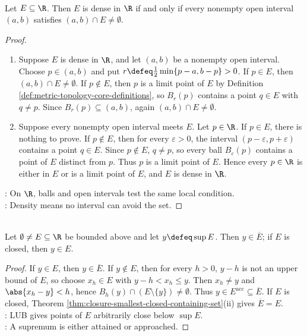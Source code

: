 \begin{proposition} \label{prop:dense-closure-and-interval-test} \\
Let $E\subseteq\R$. Then $E$ is dense in $\R$ if and only if every nonempty open interval $(a,b)$ satisfies $(a,b)\cap E\neq\emptyset$.
\begin{proof}
\begin{enumerate}[label=\roman*.]
\setlength{\itemsep}{0pt}
\item[$(\Rightarrow)$] Suppose $E$ is dense in $\R$, and let $(a,b)$ be a nonempty open interval. Choose $p\in(a,b)$ and put $r\defeq\frac12\min\{p-a,b-p\}>0$. If $p\in E$, then $(a,b)\cap E\neq\emptyset$. If $p\notin E$, then $p$ is a limit point of $E$ by Definition \ref{def:metric-topology-core-definitions}, so $B_r(p)$ contains a point $q\in E$ with $q\neq p$. Since $B_r(p)\subseteq(a,b)$, again $(a,b)\cap E\neq\emptyset$.
\item[$(\Leftarrow)$] Suppose every nonempty open interval meets $E$. Let $p\in\R$. If $p\in E$, there is nothing to prove. If $p\notin E$, then for every $\varepsilon>0$, the interval $(p-\varepsilon,p+\varepsilon)$ contains a point $q\in E$. Since $p\notin E$, $q\neq p$, so every ball $B_\varepsilon(p)$ contains a point of $E$ distinct from $p$. Thus $p$ is a limit point of $E$. Hence every $p\in\R$ is either in $E$ or is a limit point of $E$, and $E$ is dense in $\R$.
\end{enumerate}
: On $\R$, balls and open intervals test the same local condition.\\
: Density means no interval can avoid the set.
\end{proof}
\end{proposition}

\begin{theorem} \label{thm:supremum-belongs-to-closure} \\
Let $\emptyset\neq E\subseteq\R$ be bounded above and let $y\defeq\sup E$. Then $y\in\overline{E}$; if $E$ is closed, then $y\in E$.
\begin{proof}
If $y\in E$, then $y\in\overline{E}$. If $y\notin E$, then for every $h>0$, $y-h$ is not an upper bound of $E$, so choose $x_h\in E$ with $y-h<x_h\leq y$. Then $x_h\neq y$ and $\abs{x_h-y}<h$, hence $B_h(y)\cap(E\setminus\{y\})\neq\emptyset$. Thus $y\in E^{\operatorname{acc}}\subseteq\overline{E}$. If $E$ is closed, Theorem \ref{thm:closure-smallest-closed-containing-set}(ii) gives $\overline{E}=E$.\\
: LUB gives points of $E$ arbitrarily close below $\sup E$.\\
: A supremum is either attained or approached.
\end{proof}
\end{theorem}

